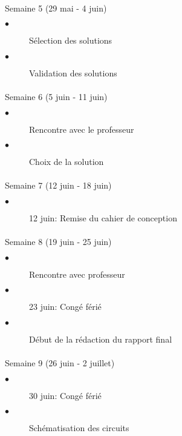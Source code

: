 \begin{multicols}{2}
\begin{description}
			\end{description}
		
		\paragraph{}
		Semaine 5 (29 mai - 4 juin)
			\begin{description}
				\item[$\bullet$] Sélection des solutions	
				\item[$\bullet$] Validation des solutions
			\end{description}
		
			
		\paragraph{}
		Semaine 6 (5 juin - 11 juin)
			\begin{description}
				\item[$\bullet$] Rencontre avec le professeur
				\item[$\bullet$] Choix de la solution			
				
    			    
			\end{description}		
		
		\paragraph{}
		Semaine 7 (12 juin - 18 juin)
			\begin{description}
				\item[$\bullet$] 12 juin: Remise du cahier de conception
			\end{description}
		
		\paragraph{}
		Semaine 8 (19 juin - 25 juin)
			\begin{description}
				\item[$\bullet$] Rencontre avec professeur
				\item[$\bullet$] 23 juin: Congé férié
				\item[$\bullet$] Début de la rédaction du rapport final
				
			\end{description}
		\columnbreak
		\paragraph{}
		Semaine 9 (26 juin - 2 juillet)
			\begin{description}
				\item[$\bullet$] 30 juin: Congé férié
				\item[$\bullet$] Schématisation	des circuits		
		\end{description}


\end{multicols}
